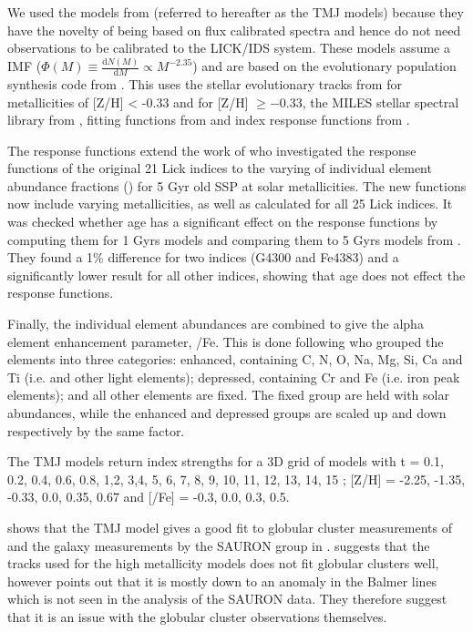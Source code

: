 		We used the models from \citet{Thomas2010} (referred to hereafter as the TMJ models) because they have the novelty of being based on flux calibrated spectra and hence do not need observations to be calibrated to the LICK/IDS system. These models assume a \citet{Salpeter1955} IMF ($\Phi(M) \equiv \frac{\mathrm{d}N(M)}{\mathrm{d}M} \propto M^{-2.35}$) and are based on the evolutionary population synthesis code from \citet{Maraston1998}. This uses the stellar evolutionary tracks from \citet{Cassisi1997} for metallicities of [Z/H] < -0.33 and \citet{Girardi2000} for [Z/H] $\ge -0.33$, the MILES stellar spectral library from \citet{Sanchez-Blazquez2006a, Falcon-Barroso2011a}, fitting functions from \citet{Johansson2010} and index response functions from \citet{Korn2005}.

		The \citet{Korn2005} response functions extend the work of \citet{Tripicco1995} who investigated the response functions of the original 21 Lick indices to the varying of individual element abundance fractions () for 5 Gyr old SSP at solar metallicities. The new functions now include varying metallicities, as well as calculated for all 25 Lick indices. It was checked whether age has a significant effect on the response functions by computing them for 1 Gyrs models and comparing them to 5 Gyrs models from \citet{Tripicco1995}. They found a 1\% difference for two indices (G4300 and Fe4383) and a significantly lower result for all other indices, showing that age does not effect the response functions.

		Finally, the individual element abundances are combined to give the alpha element enhancement parameter, \textalpha/Fe. This is done following \citet{Trager2000} who grouped the elements into three categories: enhanced, containing C, N, O, Na, Mg, Si, Ca and Ti (i.e. \textalpha and other light elements); depressed, containing Cr and Fe (i.e. iron peak elements); and all other elements are fixed. The fixed group are held with solar abundances, while the enhanced and depressed groups are scaled up and down respectively by the same factor. 

		The TMJ models return index strengths for a 3D grid of models with t = 0.1, 0.2, 0.4, 0.6, 0.8, 1,2, 3,4, 5, 6, 7, 8, 9, 10, 11, 12, 13, 14, 15 ; [Z/H] = -2.25, -1.35, -0.33, 0.0, 0.35, 0.67 and [\alpha/Fe] = -0.3, 0.0, 0.3, 0.5.  

		\citet{Thomas2010} shows that the TMJ model gives a good fit to globular cluster measurements of \citet{Puzia2002, Schiavon2005} and the galaxy measurements by the SAURON group in \citet{Kuntschner2010}. \citet{Conroy2010} suggests that the \citet{Girardi2000} tracks used for the high metallicity models does not fit globular clusters well, however \citet{Thomas2010} points out that it is mostly down to an anomaly in the Balmer lines which is not seen in the analysis of the SAURON data. They therefore suggest that it is an issue with the globular cluster observations themselves. 

